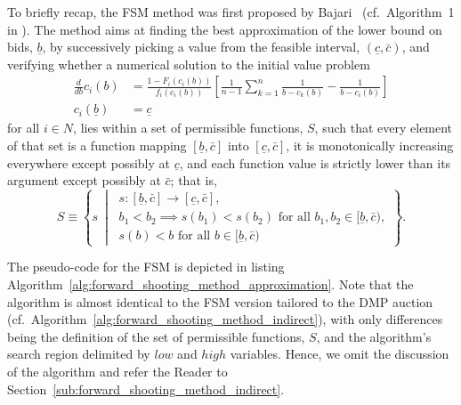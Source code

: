 To briefly recap, the FSM method was first proposed by Bajari~\cite{Bajari2001a} (cf.~Algorithm~1 in \cite{Bajari2001a}). The method aims at finding the best approximation of the lower bound on bids, $\underline{b}$, by successively picking a value from the feasible interval, $(\underline{c}, \bar{c})$, and verifying whether a numerical solution to the initial value problem
\begin{equation}
  \label{eq:fsm_initial_value_problem_approximation}
  \begin{array}{ll}
     \displaystyle\frac{d}{db}c_i(b) &= \displaystyle\frac{1 - F_i(c_i(b))}{f_i(c_i(b))}\left[ \frac{1}{n-1}\sum_{k=1}^n \frac{1}{b-c_k(b)} - \frac{1}{b-c_i(b)} \right]\\[2ex]
    c_i(\underline{b}) &= \underline{c}
  \end{array}
\end{equation}
for all $i\in N$, lies within a set of permissible functions, $S$, such that every element of that set is a function mapping $[\underline{b}, \bar{c}]$ into $[\underline{c}, \bar{c}]$, it is monotonically increasing everywhere except possibly at $\underline{c}$, and each function value is strictly lower than its argument except possibly at $\bar{c}$; that is,
\begin{equation*}
  S\equiv\left\{s \:\middle\vert\:
  \begin{array}{l}
    s: [\underline{b}, \bar{c}]\to [\underline{c}, \bar{c}],\\
    b_1 < b_2\implies s(b_1) < s(b_2) \text{ for all }b_1,b_2\in [\underline{b}, \bar{c}),\\
    s(b) < b \text{ for all }b\in [\underline{b}, \bar{c})
  \end{array}
  \right\}.
\end{equation*}

The pseudo-code for the FSM is depicted in listing Algorithm~\ref{alg:forward_shooting_method_approximation}. Note that the algorithm is almost identical to the FSM version tailored to the DMP auction (cf.~Algorithm~\ref{alg:forward_shooting_method_indirect}), with only differences being the definition of the set of permissible functions, $S$, and the algorithm's search region delimited by $low$ and $high$ variables. Hence, we omit the discussion of the algorithm and refer the Reader to Section~\ref{sub:forward_shooting_method_indirect}.


